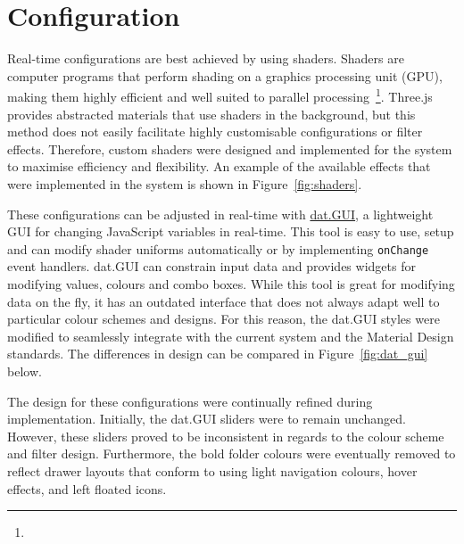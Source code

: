 \section{Configuration} {
\label{sec:configuration_implementation}

	Real-time configurations are best achieved by using shaders. Shaders are computer programs that perform shading on a graphics processing unit (GPU), making them highly efficient and well suited to parallel processing~\footnote{}. Three.js provides abstracted materials that use shaders in the background, but this method does not easily facilitate highly customisable configurations or filter effects. Therefore, custom shaders were designed and implemented for the system to maximise efficiency and flexibility. An example of the available effects that were implemented in the system is shown in Figure~\ref{fig:shaders}.

	

	These configurations can be adjusted in real-time with \href{http://workshop.chromeexperiments.com/}{dat.GUI}, a lightweight GUI for changing JavaScript variables in real-time. This tool is easy to use, setup and can modify shader uniforms automatically or by implementing \texttt{onChange} event handlers. dat.GUI can constrain input data and provides widgets for modifying values, colours and combo boxes. While this tool is great for modifying data on the fly, it has an outdated interface that does not always adapt well to particular colour schemes and designs. For this reason, the dat.GUI styles were modified to seamlessly integrate with the current system and the Material Design standards. The differences in design can be compared in Figure~\ref{fig:dat_gui} below.

	

	The design for these configurations were continually refined during implementation. Initially, the dat.GUI sliders were to remain unchanged. However, these sliders proved to be inconsistent in regards to the colour scheme and filter design. Furthermore, the bold folder colours were eventually removed to reflect drawer layouts that conform to using light navigation colours, hover effects, and left floated icons.

}

